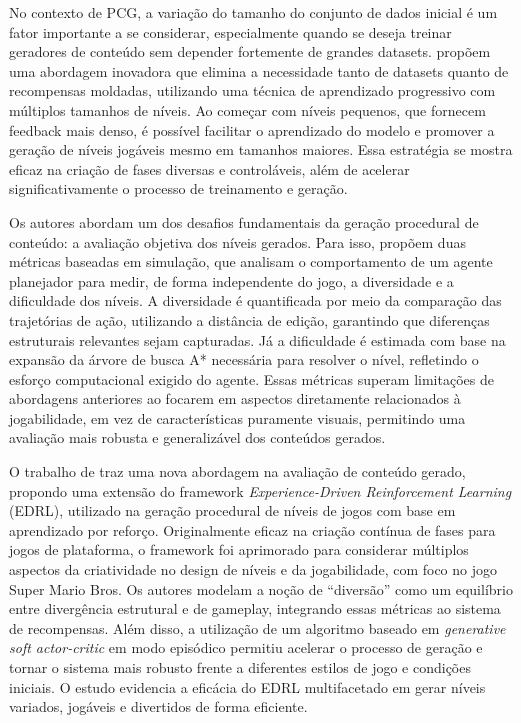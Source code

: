No contexto de PCG, a variação do tamanho do conjunto de dados inicial é um fator importante a se considerar, 
especialmente quando se deseja treinar geradores de conteúdo sem depender fortemente de grandes datasets. 
 propõem uma abordagem inovadora que elimina a necessidade tanto de datasets quanto de 
recompensas moldadas, utilizando uma técnica de aprendizado progressivo com múltiplos tamanhos de níveis. 
Ao começar com níveis pequenos, que fornecem feedback mais denso, é possível facilitar o aprendizado do modelo e 
promover a geração de níveis jogáveis mesmo em tamanhos maiores. Essa estratégia 
se mostra eficaz na criação de fases diversas e controláveis, além de acelerar significativamente o processo de treinamento e geração.


Os autores  
abordam um dos desafios fundamentais da geração procedural de conteúdo: 
a avaliação objetiva dos níveis gerados. Para isso, propõem duas métricas baseadas em simulação, que analisam o 
comportamento de um agente planejador para medir, de forma independente do jogo, a diversidade e a dificuldade dos níveis. 
A diversidade é quantificada por meio da comparação das trajetórias de ação, utilizando a distância de edição, garantindo 
que diferenças estruturais relevantes sejam capturadas. Já a dificuldade é estimada com base na expansão da árvore de busca 
A* necessária para resolver o nível, refletindo o esforço computacional exigido do agente. Essas métricas superam limitações 
de abordagens anteriores ao focarem em aspectos diretamente relacionados à jogabilidade, em vez de características puramente 
visuais, permitindo uma avaliação mais robusta e generalizável dos conteúdos gerados.


O trabalho de  traz uma nova abordagem na avaliação de conteúdo gerado, propondo uma extensão 
do framework \textit{Experience-Driven Reinforcement Learning} (EDRL), utilizado na geração procedural de níveis de jogos com 
base em aprendizado por reforço. Originalmente eficaz na criação contínua de fases para jogos de plataforma, 
o framework foi aprimorado para considerar múltiplos aspectos da criatividade no design de níveis e da jogabilidade, 
com foco no jogo Super Mario Bros. Os autores modelam a noção de “diversão” como um equilíbrio entre 
divergência estrutural e de gameplay, integrando essas métricas ao sistema de recompensas. 
Além disso, a utilização de um algoritmo baseado em \textit{generative soft actor-critic} em modo episódico 
permitiu acelerar o processo de geração e tornar o sistema mais robusto frente a diferentes estilos 
de jogo e condições iniciais. O estudo evidencia a eficácia do EDRL multifacetado em gerar níveis 
variados, jogáveis e divertidos de forma eficiente.